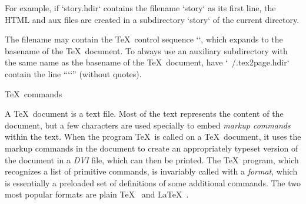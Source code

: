 For example, if `story.hdir` contains the filename
`story` as its first line, the HTML and aux files are
created in a subdirectory `story` of the
current directory.


The filename may contain the \TeX\ control sequence
`\jobname`, which expands to the basename of
the \TeX\ document.  To always use an auxiliary
subdirectory with the same name as the basename of the
\TeX\ document, have `~/.tex2page.hdir` contain the
line “`\jobname`” (without quotes).

\iffalse
beginsection Info files

If a \TeX2page-generated set of HTML files is largely text, it can be
read using text-based browsers such as Lynx~\cite{lynx}.  However, many
people would rather view it as an Info~\cite{texinfo} document. Info files can be
browsed very rapidly in a text editor or a lightweight console browser;
allow convenient regex search across the entire document; and can
be read as plain text as they have much less markup than the
corresponding HTML.

The \TeX2page distribution includes a script `t2p2info` for converting
\TeX2page-generated HTML into Info.  `t2p2info` takes as argument the
filename of the main HTML file generated by \TeX2page, e.g.,

\begintt
t2p2info jobname.html
\endtt
The result is one or more Info files, the first of them named
`jobname.info`.
\fi

\iffalse
Split following into two chapters, “\TeX\ commands”, about
commands that \TeX2page doesn’t recognize,
and
“\TeX2page commands”, about commands that \TeX\ doesn’t
recognize, without help, i.e.  (The latter may simply be
because the command is from a different format.  \TeX2page
recognizes both formats, but one format may not recognize
the commands of the other.  Esp., plain \TeX\ won’t understand
\LaTeX\ cmds.

Perhaps “Paper and Screen” chapter can be rolled into these
two chapters.  Can probably eliminate or at least
drastically shorten the chapters about
Sections, Verbatim, Cross-references, Color.

Readers of this manual and users of this program will
already know (La)TeX.  It is not this manual’s job to
introduce them to what’s possible in (La)TeX.
\fi

  \TeX\ commands

 
%
A \TeX\ document is a text file.  Most of the text
represents the content of the document, but a few
characters are used specially to embed {\em markup
commands} within the text.  When
the program \TeX\ is called on a \TeX\
document, it uses the markup commands in the document
to create an appropriately typeset version of the
document in a {\em DVI} file, which can then be
printed.  The \TeX\ program, which
recognizes a list of primitive commands, is invariably
called with a {\em format}, which is essentially a
preloaded set of definitions of some additional
commands.  The two most popular formats
are plain \TeX~\cite{texbook} and \LaTeX~\cite{latex}.

